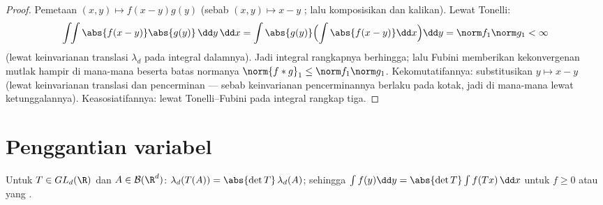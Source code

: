 \begin{proof}
Pemetaan $(x, y) \mapsto f(x-y)g(y)$  (sebab $(x,y)\mapsto x -
y$ ; lalu komposisikan dan kalikan). Lewat Tonelli:
\[
\int\!\!\int \abs{f(x-y)}\abs{g(y)}\,\dd y\,\dd x
= \int\abs{g(y)}\Bigl(\int\abs{f(x - y)}\dd x\Bigr)\dd y
= \norm f_1\norm g_1 < \infty
\]
(lewat keinvarianan translasi $\lambda_d$ pada integral dalamnya).
Jadi integral rangkapnya berhingga; lalu Fubini memberikan kekonvergenan
mutlak hampir di mana-mana beserta batas normanya $\norm{f*g}_1 \leq \norm
f_1\norm g_1$. Kekomutatifannya: substitusikan $y \mapsto x - y$
(lewat keinvarianan translasi dan pencerminan --- sebab keinvarianan
pencerminannya berlaku pada kotak, jadi di mana-mana lewat ketunggalannya).
Keasosiatifannya: lewat Tonelli--Fubini pada integral rangkap tiga.
\end{proof}

\section{Penggantian variabel}

\begin{theorem}
\label{thm:b3:product:linearchange}
Untuk $T \in GL_d(\R)$ dan $A \in \mathcal B(\R^d)$:
$\lambda_d(T(A)) = \abs{\det T}\,\lambda_d(A)$; sehingga
$\int f(y)\dd y = \abs{\det T}\int f(Tx)\,\dd x$ untuk $f \geq 0$
atau yang .
\end{theorem}


